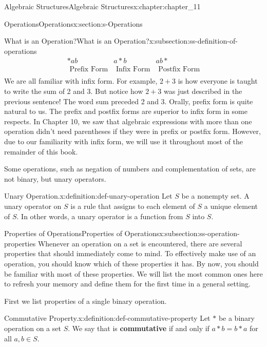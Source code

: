 \documentclass[oneside,10pt,]{book}
\newcommand{\terminology}[1]{\textbf{#1}}
\numberwithin{equation}{section}
\begin{document}
\begin{chapterptx}{Algebraic Structures}{}{Algebraic Structures}{}{}{x:chapter:chapter_11}
\begin{sectionptx}{Operations}{}{Operations}{}{}{x:section:s-Operations}
\begin{subsectionptx}{What is an Operation?}{}{What is an Operation?}{}{}{x:subsection:ss-definition-of-operations}
\begin{equation*}
\begin{array}{ccc}
*a b & a*b & a b * \\
\textrm{ Prefix Form} & \textrm{ Infix Form} & \textrm{ Postfix Form} \\
\end{array}
\end{equation*}
We are all familiar with infix form. For example, \(2 + 3\) is how everyone is taught to write the sum of 2 and 3. But notice how \(2 + 3\) was just described in the previous sentence! The word sum preceded 2 and 3. Orally, prefix form is quite natural to us. The prefix and postfix forms are superior to infix form in some respects. In Chapter 10, we saw that algebraic expressions with more than one operation didn't need parentheses if they were in prefix or postfix form. However, due to our familiarity with infix form, we will use it throughout most of the remainder of this book.%
\par
Some operations, such as negation of numbers and complementation of sets, are not binary, but unary operators.%
\begin{definition}{Unary Operation.}{x:definition:def-unary-operation}%
%
Let  \(S\) be a nonempty set. A unary operator on \(S\) is a rule that assigns to each element of \(S\) a unique element of \(S\). In other words, a unary operator is a function from \(S\) into \(S\).%
\end{definition}
\end{subsectionptx}
%
%
\typeout{************************************************}
\typeout{************************************************}
%
\begin{subsectionptx}{Properties of Operations}{}{Properties of Operations}{}{}{x:subsection:ss-operation-properties}
%
Whenever an operation on a set is encountered, there are several properties that should immediately come to mind. To effectively make use of an operation, you should know which of these properties it has. By now, you should be familiar with most of these properties. We will list the most common ones here to refresh your memory and define them for the first time in a general setting.%
\par
First we list properties of a single binary operation.%
\begin{definition}{Commutative Property.}{x:definition:def-commutative-property}%
%
Let \(*\) be a binary operation on a set \(S\). We say that \textasteriskcentered{} is \terminology{commutative} if and only if \(a * b = b * a\)  for all \(a, b \in  S\).%

\end{definition}
\end{subsectionptx}
\end{sectionptx}
\end{chapterptx}
\end{document}
